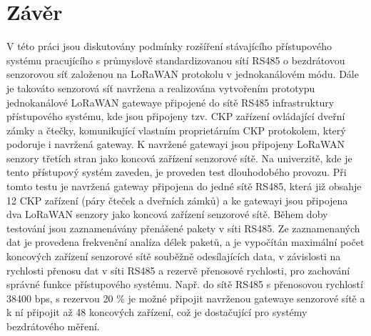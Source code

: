 \chapter{Závěr}
V této práci jsou diskutovány podmínky rozšíření stávajícího přístupového systému pracujícího s průmyslově standardizovanou sítí RS485 o bezdrátovou senzorovou síť založenou na LoRaWAN protokolu v jednokanálovém módu.
Dále je takováto senzorová síť navržena a realizována vytvořením prototypu jednokanálové LoRaWAN gatewaye připojené do sítě RS485 infrastruktury přístupového systému, kde jsou připojeny tzv. CKP zařízení ovládající dveřní zámky a čtečky, komunikující vlastním proprietárním CKP protokolem, který podoruje i navržená gateway.
K navržené gatewayi jsou připojeny LoRaWAN senzory třetích stran jako koncová zařízení senzorové sítě.
Na univerzitě, kde je tento přístupový systém zaveden, je proveden test dlouhodobého provozu. Při tomto testu je navržená gateway připojena do jedné sítě RS485, která již obsahje 12 CKP zařízení (páry čteček a dveřních zámků) a ke gatewayi jsou připojena dva LoRaWAN senzory jako koncová zařízení senzorové sítě.
Během doby testování jsou zaznamenávány přenášené pakety v síti RS485.
Ze zaznamenaných dat je provedena frekvenční analíza délek paketů, a je vypočítán maximální počet koncových zařízení senzorové sítě souběžně odesílajících data, v závislosti na rychlosti přenosu dat v síti RS485 a rezervě přenosové rychlosti, pro zachování správné funkce přístupového systému.
Např. do sítě RS485 s přenosovou rychlostí 38400 bps, s rezervou 20 \% je možné připojit navrženou gatewaye senzorové sítě a k ní připojit až 48 koncových zařízení, což je dostačující pro systémy bezdrátového měření.








